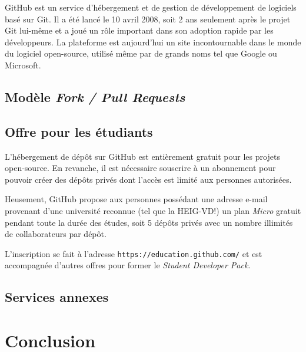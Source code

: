 \documentclass[11pt,a4paper]{article}
\begin{document}
GitHub est un service d'hébergement et de gestion de développement de logiciels basé sur Git.
Il a été lancé le 10 avril 2008, soit 2 ans seulement après le projet Git lui-même et a joué un rôle important dans son adoption rapide par les développeurs.
La plateforme est aujourd'hui un site incontournable dans le monde du logiciel open-source, utilisé même par de grands noms tel que Google ou Microsoft. 

\subsection{Modèle \textit{Fork / Pull Requests}}


\subsection{Offre pour les étudiants}

L'hébergement de dépôt sur GitHub est entièrement gratuit pour les projets open-source.
En revanche, il est nécessaire souscrire à un abonnement pour pouvoir créer des dépôts privés dont l'accès est limité aux personnes autorisées.

Heusement, GitHub propose aux personnes possédant une adresse e-mail provenant d'une université reconnue (tel que la HEIG-VD!) un plan \textit{Micro} gratuit pendant toute la durée des études, soit 5 dépôts privés avec un nombre illimités de collaborateurs par dépôt.

L'inscription se fait à l'adresse {\tt https://education.github.com/} et est accompagnée d'autres offres pour former le {\it Student Developer Pack}.

\subsection{Services annexes}

\section{Conclusion}

\pagebreak
{}
\end{document}
